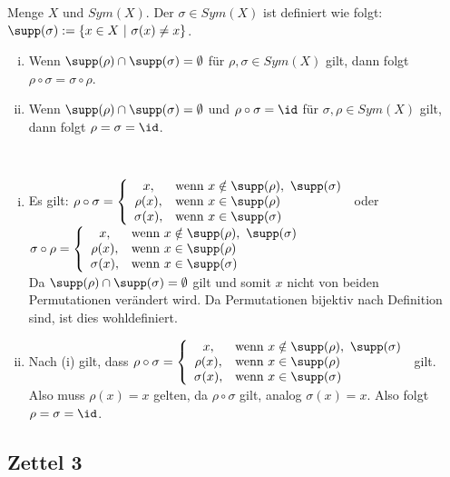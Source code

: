 Menge $X$ und $Sym(X)$. Der  $\sigma \in Sym(X)$ ist definiert wie folgt: $\supp(\sigma):=\{x\in X~|~\sigma(x)\not=x \}$.
\begin{enumerate}[(i)]
	\item Wenn $\supp(\rho)\cap \supp(\sigma)=\emptyset$ für $\rho, \sigma \in Sym(X)$ gilt, dann folgt $\rho \circ \sigma=\sigma \circ \rho$.
	\item Wenn $\supp(\rho)\cap \supp(\sigma)=\emptyset$ und $\rho \circ \sigma=\id$ für $\sigma,\rho\in Sym(X)$ gilt, dann folgt $\rho=\sigma=\id$.
\end{enumerate}

\\
\begin{enumerate}[(i)]
	\item Es gilt: $\rho\circ\sigma=\left\{\begin{array}{cl} x, & \text{wenn } x\notin \supp(\rho),~\supp(\sigma)\\ \rho(x), & \text{wenn } x\in \supp(\rho)\\ \sigma(x), & \text{wenn } x\in \supp(\sigma) \end{array}\right.$
	oder 
	$\sigma\circ\rho=\left\{\begin{array}{cl} x, & \text{wenn } x\notin \supp(\rho),~\supp(\sigma)\\ \rho(x), & \text{wenn } x\in \supp(\rho)\\ \sigma(x), & \text{wenn } x\in \supp(\sigma) \end{array}\right.$\\
	
	Da $\supp(\rho)\cap \supp(\sigma)=\emptyset$ gilt und somit $x$ nicht von beiden Permutationen verändert wird. Da Permutationen bijektiv nach Definition sind, ist dies wohldefiniert.
	\item Nach (i) gilt, dass $\rho\circ\sigma=\left\{\begin{array}{cl} x, & \text{wenn } x\notin \supp(\rho),~\supp(\sigma)\\ \rho(x), & \text{wenn } x\in \supp(\rho)\\ \sigma(x), & \text{wenn } x\in \supp(\sigma) \end{array}\right.$ gilt.\\
	
	Also muss $\rho(x)=x$ gelten, da $\rho\circ\sigma$ gilt, analog $\sigma(x)=x$. Also folgt $\rho=\sigma=\id$.
\end{enumerate}

\subsection*{Zettel 3}
\label{sub:zettel_3alg}




